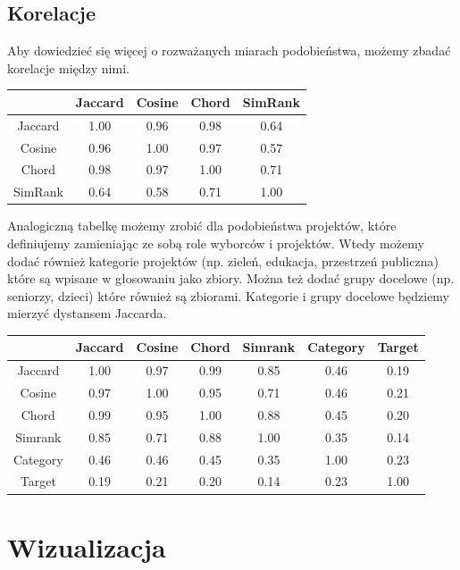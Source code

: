 \documentclass{article}
\begin{document}
\subsection{Korelacje}

Aby dowiedzieć się więcej o rozważanych miarach podobieństwa, możemy zbadać
korelacje między nimi.

\begin{center}
\begin{tabular}{|c|cccc|}
  \hline
    & Jaccard & Cosine & Chord & SimRank \\
  \hline
  Jaccard & 1.00 & 0.96 & 0.98 & 0.64 \\
  Cosine  & 0.96 & 1.00 & 0.97 & 0.57 \\
  Chord   & 0.98 & 0.97 & 1.00 & 0.71 \\
  SimRank & 0.64 & 0.58 & 0.71 & 1.00 \\
  \hline
\end{tabular}
\end{center}

Analogiczną tabelkę możemy zrobić dla podobieństwa projektów, które definiujemy
zamieniając ze sobą role wyborców i projektów. Wtedy możemy dodać również
kategorie projektów (np. zieleń, edukacja, przestrzeń publiczna) które są
wpisane w głosowaniu jako zbiory. Można też dodać grupy docelowe (np. seniorzy,
dzieci) które również są zbiorami. Kategorie i grupy docelowe będziemy mierzyć
dystansem Jaccarda.

\begin{center}
\begin{tabular}{|c|cccccc|}
  \hline
    & Jaccard & Cosine & Chord & Simrank & Category & Target \\
  \hline
  Jaccard & 1.00 & 0.97 & 0.99 & 0.85 & 0.46 & 0.19 \\
  Cosine & 0.97 & 1.00 & 0.95 & 0.71 & 0.46 & 0.21 \\
  Chord & 0.99 & 0.95 & 1.00 & 0.88 & 0.45 & 0.20 \\
  Simrank & 0.85 & 0.71 & 0.88 & 1.00 & 0.35 & 0.14 \\
  Category & 0.46 & 0.46 & 0.45 & 0.35 & 1.00	& 0.23 \\
  Target & 0.19 & 0.21 & 0.20 & 0.14 & 0.23	& 1.00 \\
  \hline
\end{tabular}
\end{center}

\section{Wizualizacja}
\end{document}
